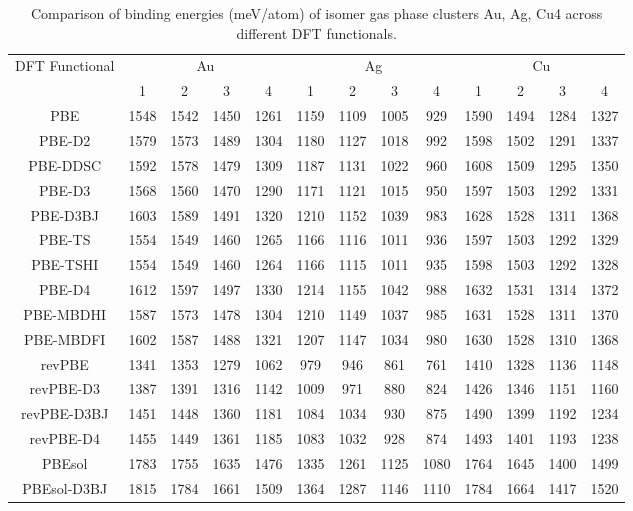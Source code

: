 \begin{table}[ht]
\centering
\caption{Comparison of binding energies (meV/atom) of isomer gas phase clusters Au, Ag, Cu4 across different DFT functionals.}
\begin{tabular}{ccccccccccccc}
\hline\hline
DFT Functional & \multicolumn{4}{c}{Au} & \multicolumn{4}{c}{Ag} & \multicolumn{4}{c}{Cu} \\ 
\cline{2-13}
 & 1 & 2 & 3 & 4 & 1 & 2 & 3 & 4 & 1 & 2 & 3 & 4 \\ \hline
PBE & 1548 & 1542 & 1450 & 1261 & 1159 & 1109 & 1005 & 929 & 1590 & 1494 & 1284 & 1327 \\ 
PBE-D2 & 1579 & 1573 & 1489 & 1304 & 1180 & 1127 & 1018 & 992 & 1598 & 1502 & 1291 & 1337 \\ 
PBE-DDSC & 1592 & 1578 & 1479 & 1309 & 1187 & 1131 & 1022 & 960 & 1608 & 1509 & 1295 & 1350 \\ 
PBE-D3 & 1568 & 1560 & 1470 & 1290 & 1171 & 1121 & 1015 & 950 & 1597 & 1503 & 1292 & 1331 \\ 
PBE-D3BJ & 1603 & 1589 & 1491 & 1320 & 1210 & 1152 & 1039 & 983 & 1628 & 1528 & 1311 & 1368 \\ 
PBE-TS & 1554 & 1549 & 1460 & 1265 & 1166 & 1116 & 1011 & 936 & 1597 & 1503 & 1292 & 1329 \\ 
PBE-TSHI & 1554 & 1549 & 1460 & 1264 & 1166 & 1115 & 1011 & 935 & 1598 & 1503 & 1292 & 1328 \\ 
PBE-D4 & 1612 & 1597 & 1497 & 1330 & 1214 & 1155 & 1042 & 988 & 1632 & 1531 & 1314 & 1372 \\ 
PBE-MBDHI & 1587 & 1573 & 1478 & 1304 & 1210 & 1149 & 1037 & 985 & 1631 & 1528 & 1311 & 1370 \\ 
PBE-MBDFI & 1602 & 1587 & 1488 & 1321 & 1207 & 1147 & 1034 & 980 & 1630 & 1528 & 1310 & 1368 \\ 
revPBE & 1341 & 1353 & 1279 & 1062 & 979 & 946 & 861 & 761 & 1410 & 1328 & 1136 & 1148 \\ 
revPBE-D3 & 1387 & 1391 & 1316 & 1142 & 1009 & 971 & 880 & 824 & 1426 & 1346 & 1151 & 1160 \\ 
revPBE-D3BJ & 1451 & 1448 & 1360 & 1181 & 1084 & 1034 & 930 & 875 & 1490 & 1399 & 1192 & 1234 \\ 
revPBE-D4 & 1455 & 1449 & 1361 & 1185 & 1083 & 1032 & 928 & 874 & 1493 & 1401 & 1193 & 1238 \\ 
PBEsol & 1783 & 1755 & 1635 & 1476 & 1335 & 1261 & 1125 & 1080 & 1764 & 1645 & 1400 & 1499 \\ 
PBEsol-D3BJ & 1815 & 1784 & 1661 & 1509 & 1364 & 1287 & 1146 & 1110 & 1784 & 1664 & 1417 & 1520 \\ 

\end{tabular}
\end{table}
